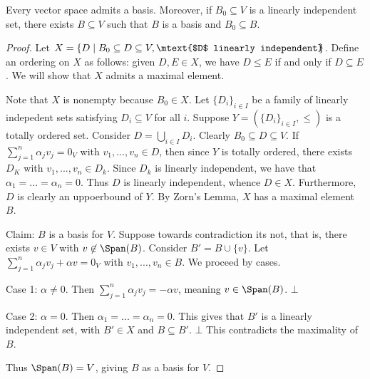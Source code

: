     \begin{proposition}
        Every vector space admits a basis. Moreover, if $B_0 \subseteq V$ is a linearly independent set, there exists $B \subseteq V$ such that $B$ is a basis and $B_0 \subseteq B$.
    \end{proposition}
        \begin{proof}
            Let $X = \{D \mid B_0 \subseteq D \subseteq V, \mtext{$D$ linearly independent}\hspace{-4pt}\}$. Define an ordering on $X$ as follows: given $D,E \in X$, we have $D \leq E$ if and only if $D \subseteq E$. We will show that $X$ admits a maximal element. \nl
            
            Note that $X$ is nonempty because $B_0 \in X$. Let $\{D_i\}_{i \in I}$ be a family of linearly indepedent sets satisfying $D_i \subseteq V$ for all $i$. Suppose $Y = (\{D_i\}_{i \in I}, \leq)$ is a totally ordered set. Consider $D = \bigcup_{i \in I}D_i$. Clearly $B_0 \subseteq D \subseteq V$. If $\sum_{j = 1}^n \alpha_j v_j = 0_V$ with $v_1,...,v_n \in D$, then since $Y$ is totally ordered, there exists $D_K$ with $v_1,...,v_n \in D_k$. Since $D_k$ is linearly independent, we have that $\alpha_1 = ... = \alpha_n = 0$. Thus $D$ is linearly independent, whence $D \in X$. Furthermore, $D$ is clearly an uppoerbound of $Y$. By Zorn's Lemma, $X$ has a maximal element $B$. \nl
            
            Claim: $B$ is a basis for $V$. Suppose towards contradiction its not, that is, there exists $v \in V$ with $v \not\in \Span(B)$. Consider $B' = B \cup \{v\}$. Let $\sum_{j = 1}^n \alpha_j v_j + \alpha v = 0_V$ with $v_1,...,v_n \in B$. We proceed by cases. \nl
            
            Case 1: $\alpha \neq 0$. Then $\sum_{j =1}^n \alpha_j v_j = -\alpha v$, meaning $v \in \Span(B)$. $\bot$ \nl
            
            Case 2: $\alpha = 0$. Then $\alpha_1 = ... = \alpha_n = 0$. This gives that $B'$ is a linearly independent set, with $B' \in X$ and $B \subseteq B'$. $\bot$ This contradicts the maximality of $B$. \nl
            
            Thus $\Span(B) = V$, giving $B$ as a basis for $V$.
        \end{proof}

